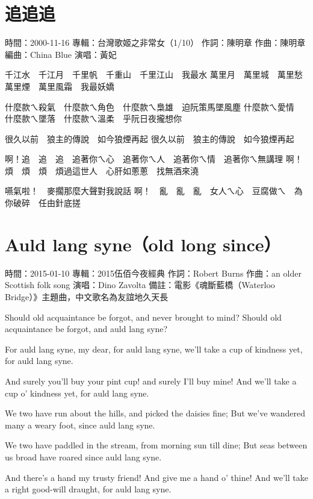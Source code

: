 \documentclass[UTF8,a4paper,oneside,twocolumn,12pt]{ctexbook}
\newcommand{\infopair}[2]{\textbullet #1：#2}
\newcommand{\zc}[1][伍佰]{\infopair{作詞}{#1}}
\newcommand{\zq}[1][伍佰]{\infopair{作曲}{#1}}
\newcommand{\bq}[1][伍佰]{\infopair{編曲}{#1}}
\newcommand{\zj}[1]{\infopair{專輯}{#1}}
\newcommand{\sj}[1]{\infopair{時間}{#1}}
\newcommand{\bz}[1]{\infopair{備註}{#1}}
\newenvironment{info}{\begin{flushleft}\kaishu
	}
	{\end{flushleft}\normalsize\yahei\par}
\newenvironment{lyric}{
	}
{}
\begin{document}
\section{追追追}
\begin{info}
	\sj{2000-11-16}
	\zj{台灣歌姬之非常女（1/10）}
	\zc[陳明章]
	\zq[陳明章]
	\bq[China Blue]
	\infopair{演唱}{黃妃}
\end{info}
\begin{lyric}
	千江水　千江月　千里帆　千重山　千里江山　我最水
	萬里月　萬里城　萬里愁　萬里煙　萬里風霜　我最妖嬌

	什麼款ㄟ殺氣　什麼款ㄟ角色　什麼款ㄟ梟雄　迫阮策馬墜風塵
	什麼款ㄟ愛情　什麼款ㄟ墜落　什麼款ㄟ溫柔　乎阮日夜攏想你

	很久以前　狼主的傳說　如今狼煙再起
	很久以前　狼主的傳說　如今狼煙再起

	啊！追　追　追　追著你ㄟ心　追著你ㄟ人　追著你ㄟ情　追著你ㄟ無講理
	啊！煩　煩　煩　煩過這世人　心肝如蔥蔥　找無酒來澆

	嚥氣啦！　麥擱那麼大聲對我說話
	啊！　亂　亂　亂　女人ㄟ心　豆腐做ㄟ　為你破碎　任由針底搓
\end{lyric}

\section{Auld lang syne（old long since）}
\begin{info}
	\sj{2015-01-10}
	\zj{2015伍佰今夜經典}
	\zc[Robert Burns]
	\zq[an older Scottish folk song]
	\infopair{演唱}{Dino Zavolta}
	\bz{電影《魂斷藍橋（Waterloo Bridge）》主題曲，中文歌名為友誼地久天長}
\end{info}
\begin{lyric}
	Should old acquaintance be forgot,
	and never brought to mind?
	Should old acquaintance be forgot,
	and auld lang syne?

	For auld lang syne, my dear,
	for auld lang syne,
	we'll take a cup of kindness yet,
	for auld lang syne.

	And surely you'll buy your pint cup!
	and surely I'll buy mine!
	And we'll take a cup o' kindness yet,
	for auld lang syne.

	We two have run about the hills,
	and picked the daisies fine;
	But we've wandered many a weary foot,
	since auld lang syne.

	We two have paddled in the stream,
	from morning sun till dine;
	But seas between us broad have roared
	since auld lang syne.

	And there's a hand my trusty friend!
	And give me a hand o' thine!
	And we'll take a right good-will draught,
	for auld lang syne.
\end{lyric}
\end{document}
